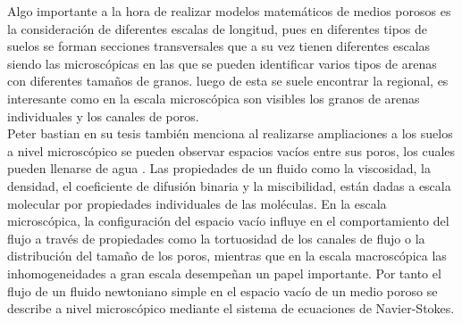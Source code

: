 Algo importante a la hora de realizar modelos matemáticos de medios porosos es la consideración de diferentes escalas de longitud, pues en diferentes tipos de suelos se forman secciones transversales que a su vez tienen diferentes escalas siendo las microscópicas en las que se pueden identificar varios tipos de arenas con diferentes tamaños de granos. luego de esta se suele encontrar la regional, es interesante como en la escala microscópica son visibles los granos de arenas individuales y los canales de poros.\\




Peter bastian en su tesis también menciona al realizarse ampliaciones a los suelos a nivel microscópico  se pueden observar espacios vacíos entre sus poros, los cuales pueden llenarse de agua \parencite{Spalding1981}.  Las propiedades de un fluido como la viscosidad, la densidad, el coeficiente de difusión binaria y la miscibilidad, están dadas a escala molecular por propiedades individuales de las moléculas. En la escala microscópica, la configuración del espacio vacío influye en el comportamiento del flujo a través de propiedades como la tortuosidad de los canales de flujo o la distribución del tamaño de los poros, mientras que en la escala macroscópica las inhomogeneidades a gran escala desempeñan un papel importante. Por tanto  el flujo de un fluido newtoniano simple en el espacio vacío de un medio poroso se describe a nivel microscópico mediante el sistema de ecuaciones de Navier-Stokes.





















